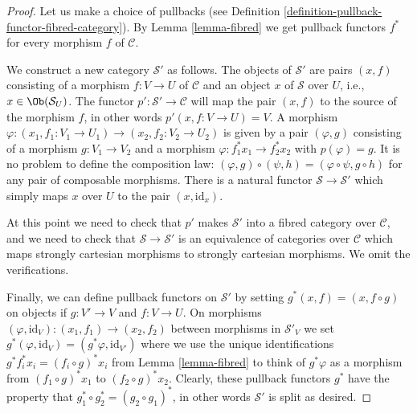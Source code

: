\begin{proof}
Let us make a choice of pullbacks (see
Definition \ref{definition-pullback-functor-fibred-category}).
By Lemma \ref{lemma-fibred} we get pullback functors $f^*$ for
every morphism $f$ of $\mathcal{C}$.

\medskip\noindent
We construct a new category $\mathcal{S}'$ as follows.
The objects of $\mathcal{S}'$ are pairs $(x, f)$
consisting of a morphism $f : V \to U$ of $\mathcal{C}$
and an object $x$ of $\mathcal{S}$ over $U$, i.e.,
$x\in \Ob(\mathcal{S}_U)$. The functor
$p' : \mathcal{S}' \to \mathcal{C}$ will map the pair $(x, f)$ to the source
of the morphism $f$, in other words $p'(x, f : V\to U) = V$. A morphism
$\varphi : (x_1, f_1: V_1 \to U_1) \to (x_2, f_2 : V_2 \to U_2)$ is given by a
pair $(\varphi, g)$ consisting of a morphism $g : V_1 \to V_2$ and a morphism
$\varphi : f_1^\ast x_1 \to f_2^\ast x_2$ with $p(\varphi) = g$. It is no
problem to define the composition law: $(\varphi, g) \circ (\psi, h) =
(\varphi \circ \psi, g\circ h)$ for any pair of composable morphisms.
There is a natural functor $\mathcal{S} \to \mathcal{S}'$ which simply maps
$x$ over $U$ to the pair $(x, \text{id}_x)$.

\medskip\noindent
At this point we need to check that $p'$ makes $\mathcal{S}'$ into a
fibred category over $\mathcal{C}$, and we need to check that
$\mathcal{S} \to \mathcal{S}'$ is an equivalence of categories over
$\mathcal{C}$ which maps strongly cartesian morphisms to strongly
cartesian morphisms. We omit the verifications.

\medskip\noindent
Finally, we can define pullback functors on $\mathcal{S}'$
by setting $g^\ast(x, f) = (x, f \circ g)$ on objects if
$g : V' \to V$ and $f : V \to U$. On morphisms
$(\varphi, \text{id}_V) : (x_1, f_1) \to (x_2, f_2)$
between morphisms in $\mathcal{S}'_V$ we set $g^\ast(\varphi, \text{id}_V) =
(g^\ast\varphi, \text{id}_{V'})$ where we use the unique identifications
$g^\ast f_i^\ast x_i = (f_i \circ g)^\ast x_i$ from Lemma
\ref{lemma-fibred} to think of $g^\ast\varphi$ as a morphism from
$(f_1 \circ g)^\ast x_1$ to $(f_2 \circ g)^\ast x_2$. Clearly, these pullback
functors $g^\ast$ have the property that
$g_1^\ast \circ g_2^\ast = (g_2\circ g_1)^\ast$, in other words $\mathcal{S}'$
is split as desired.
\end{proof}


















